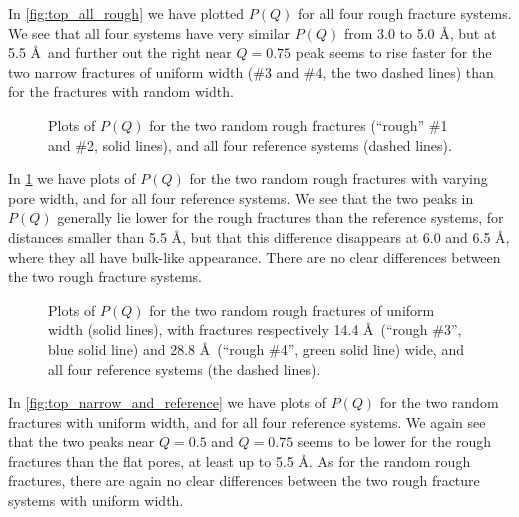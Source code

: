 In \cref{fig:top_all_rough} we have plotted $P(Q)$ for all four rough fracture systems. We see that all four systems have very similar $P(Q)$ from 3.0 to 5.0 \AA, but at 5.5 \AA\ and further out the right near $Q = 0.75$ peak seems to rise faster for the two narrow fractures of uniform width (\#3 and \#4, the two dashed lines) than for the fractures with random width.

%
\begin{figure}[!p]%
    \centering%
    \captionsetup{width=\textwidth}%
    \caption{%
        Plots of $P(Q)$ for the two random rough fractures (``rough'' \#1 and \#2, solid lines), and all four reference systems (dashed lines).%
        \label{fig:top_normal_and_reference}%
    }%
\end{figure}%

In \cref{fig:top_normal_and_reference} we have plots of $P(Q)$ for the two random rough fractures with varying pore width, and for all four reference systems. We see that the two peaks in $P(Q)$ generally lie lower for the rough fractures than the reference systems, for distances smaller than 5.5 \AA, but that this difference disappears at 6.0 and 6.5 \AA, where they all have bulk-like appearance. There are no clear differences between the two rough fracture systems.

%
\begin{figure}[!p]%
    \centering%
    \captionsetup{width=\textwidth}%
    \caption{%
        Plots of $P(Q)$ for the two random rough fractures of uniform width (solid lines), with fractures respectively 14.4 \AA\ (``rough \#3'', blue solid line) and 28.8 \AA\ (``rough \#4'', green solid line) wide, and all four reference systems (the dashed lines).%
        \label{fig:top_narrow_and_reference}%
        \label{fig:last_top_figure}%
    }%
\end{figure}%

In \cref{fig:top_narrow_and_reference} we have plots of $P(Q)$ for the two random fractures with uniform width, and for all four reference systems. We again see that the two peaks near $Q = 0.5$ and $Q = 0.75$ seems to be lower for the rough fractures than the flat pores, at least up to 5.5 \AA. As for the random rough fractures, there are again no clear differences between the two rough fracture systems with uniform width.

